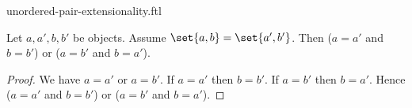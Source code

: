 \documentclass{stex}
\begin{document}
\begin{smodule}{unordered-pair-extensionality.ftl}

  \begin{forthel}
  \end{forthel}

  \begin{forthel}
    \begin{proposition}
      Let $a, a', b, b'$ be objects.
      Assume $\set{a,b} = \set{a',b'}$.
      Then ($a = a'$ and $b = b'$) or ($a = b'$ and $b = a'$).
    \end{proposition}
    \begin{proof}
      We have $a = a'$ or $a = b'$.
      If $a = a'$ then $b = b'$.
      If $a = b'$ then $b = a'$.
      Hence ($a = a'$ and $b = b'$) or ($a = b'$ and $b = a'$).
    \end{proof}
  \end{forthel}
\end{smodule}
\end{document}
